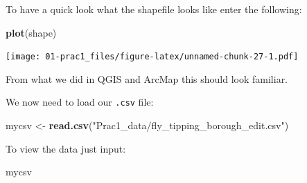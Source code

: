 \documentclass[]{book}
\newenvironment{Shaded}{\begin{snugshade}}{\end{snugshade}}
\newcommand{\KeywordTok}[1]{\textcolor[rgb]{0.13,0.29,0.53}{\textbf{#1}}}
\newcommand{\NormalTok}[1]{#1}
\newcommand{\StringTok}[1]{\textcolor[rgb]{0.31,0.60,0.02}{#1}}
\begin{document}
To have a quick look what the shapefile looks like enter the following:

\begin{Shaded}
\begin{Highlighting}[]
\KeywordTok{plot}\NormalTok{(shape)}
\end{Highlighting}
\end{Shaded}

\texttt{[image: 01-prac1\_files/figure-latex/unnamed-chunk-27-1.pdf]}

From what we did in QGIS and ArcMap this should look familiar.

We now need to load our \texttt{.csv} file:

\begin{Shaded}
\begin{Highlighting}[]
\NormalTok{mycsv <-}\StringTok{  }\KeywordTok{read.csv}\NormalTok{(}\StringTok{"Prac1_data/fly_tipping_borough_edit.csv"}\NormalTok{)  }
\end{Highlighting}
\end{Shaded}

To view the data just input:

\begin{Shaded}
\begin{Highlighting}[]
\NormalTok{mycsv }
\end{Highlighting}
\end{Shaded}
\end{document}

